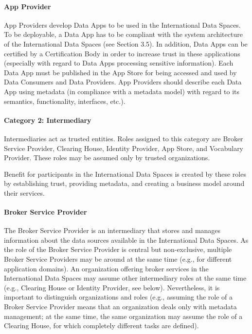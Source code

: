\paragraph{App Provider} %
App Providers develop Data Apps to be used in the International Data Spaces. To be deployable, a Data App has to be compliant with the system architecture of the International Data Spaces (see Section 3.5). In addition, Data Apps can be certified by a Certification Body in order to increase trust in these applications (especially with regard to Data Apps processing sensitive information). Each Data App must be published in the App Store for being accessed and used by Data Consumers and Data Providers. App Providers should describe each Data App using metadata (in compliance with a metadata model) with regard to its semantics, functionality, interfaces, etc.).


\paragraph{Category 2: Intermediary}
Intermediaries act as trusted entities. Roles assigned to this category are Broker Service Provider, Clearing House, Identity Provider, App Store, and Vocabulary Provider. These roles may be assumed only by trusted organizations. 

Benefit for participants in the International Data Spaces is created by these roles by establishing trust, providing metadata, and creating a business model around their services.

\paragraph{Broker Service Provider}
The Broker Service Provider is an intermediary that stores and manages information about the data sources available in the International Data Spaces. As the role of the Broker Service Provider is central but non-exclusive, multiple Broker Service Providers may be around at the same time (e.g., for different application domains). An organization offering broker services in the International Data Spaces may assume other intermediary roles at the same time (e.g., Clearing House or Identity Provider, see below). Nevertheless, it is important to distinguish organizations and roles (e.g., assuming the role of a Broker Service Provider means that an organization deals only with metadata management; at the same time, the same organization may assume the role of a Clearing House, for which completely different tasks are defined).

